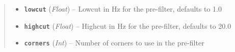 \documentclass[a4paper,10pt,english]{sphinxmanual}
\begin{document}
\begin{fulllineitems}
\begin{quote}
\begin{description}
\begin{itemize}
\item {} 
\textbf{\texttt{lowcut}} (\emph{Float}) -- Lowcut in Hz for the pre-filter, defaults to 1.0

\item {} 
\textbf{\texttt{highcut}} (\emph{Float}) -- Highcut in Hz for the pre-filter, defaults to 20.0

\item {} 
\textbf{\texttt{corners}} (\emph{Int}) -- Number of corners to use in the pre-filter

\end{itemize}

\end{description}\end{quote}

\end{fulllineitems}

\end{document}
